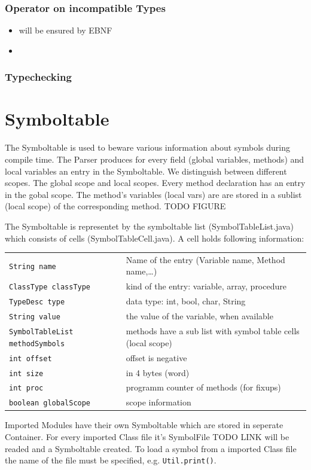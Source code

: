 \subsubsection{Operator on incompatible Types}
\begin{itemize}
  \item will be ensured by EBNF
  \item 
\end{itemize}

\subsubsection{Typechecking}

\section{Symboltable}
\label{labelSymboltable}

The Symboltable is used to beware various information about symbols during compile time.
The Parser produces for every field (global variables, methods) and local variables an entry in the Symboltable.
We distinguish between different scopes. The global scope and local scopes. Every
method declaration has an entry in the gobal scope. The method's variables (local vars) are are stored in a sublist (local scope) of the corresponding method. TODO FIGURE

The Symboltable is representet by the symboltable list (SymbolTableList.java) which consists of cells (SymbolTableCell.java).
A cell holds following information:
\newline
\newline
\begin{tabular}{lp{6cm}}
\texttt{String name} & Name of the entry (Variable name, Method name,\ldots) \\
\texttt{ClassType classType} & kind of the entry: variable, array, procedure \\
\texttt{TypeDesc type} & data type: int, bool, char, String \\
\texttt{String value} & the value of the variable, when available \\
\texttt{SymbolTableList methodSymbols} & methods have a sub list with symbol table cells (local scope)\\
\texttt{int offset} & offset is negative \\
\texttt{int size} & in 4 bytes (word) \\
\texttt{int proc} & programm counter of methods (for fixups) \\
\texttt{boolean globalScope} & scope information \\
\end{tabular}

Imported Modules have their own Symboltable which are stored in seperate Container. For every imported Class file it's SymbolFile TODO LINK will be readed and a Symboltable created. To load a symbol from a imported Class file the name of the file must be specified, e.g. \texttt{Util.print()}.






